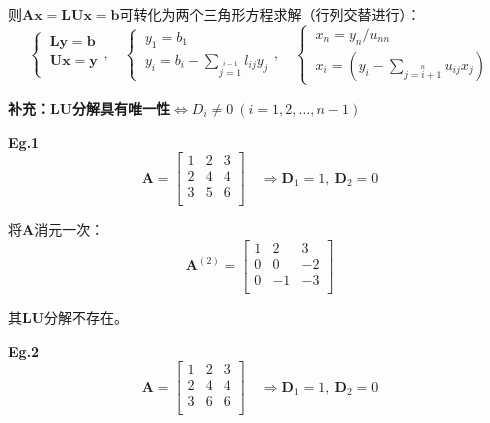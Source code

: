 则$\boldsymbol{Ax} = \boldsymbol{LUx} = \boldsymbol{b}$可转化为两个三角形方程求解（行列交替进行）：
\begin{equation}
    \begin{cases}
        \ \boldsymbol{Ly} = \boldsymbol{b} \\
        \ \boldsymbol{Ux} = \boldsymbol{y} \\
    \end{cases},\quad
    \begin{cases}
        \ y_1 = b_1 \\
        \ y_i = b_i - \sum\limits_{j=1}\limits^{i-1}l_{ij}y_j
    \end{cases},\quad
    \begin{cases}
        \ x_n = y_n / u_{nn} \\
        \ x_i = (y_i - \sum\limits_{j=i+1}\limits^{n} u_{ij}x_j)
    \end{cases}
\end{equation}


\newpage
\textbf{补充：}$\boldsymbol{LU}$\textbf{分解具有唯一性}$\Leftrightarrow D_i\neq 0\ (i=1,2,\dots,n-1)$

\textbf{Eg.1}
\begin{equation*}
    \boldsymbol{A} = \begin{bmatrix}
        1 & 2 & 3 \\
        2 & 4 & 4 \\
        3 & 5 & 6 \\
    \end{bmatrix}\quad
    \Rightarrow \boldsymbol{D}_1 = 1,\ \boldsymbol{D}_2 = 0
\end{equation*}

将$\boldsymbol{A}$消元一次：
\begin{equation*}
    \boldsymbol{A}^{(2)} = \begin{bmatrix}
        1 & 2 & 3 \\
        0 & 0 & -2 \\
        0 & -1 & -3 \\
    \end{bmatrix}
\end{equation*}

其$\boldsymbol{LU}$分解不存在。


\textbf{Eg.2}
\begin{equation*}
    \boldsymbol{A} = \begin{bmatrix}
        1 & 2 & 3 \\
        2 & 4 & 4 \\
        3 & 6 & 6 \\
    \end{bmatrix}\quad
    \Rightarrow \boldsymbol{D}_1 = 1,\ \boldsymbol{D}_2 = 0
\end{equation*}

